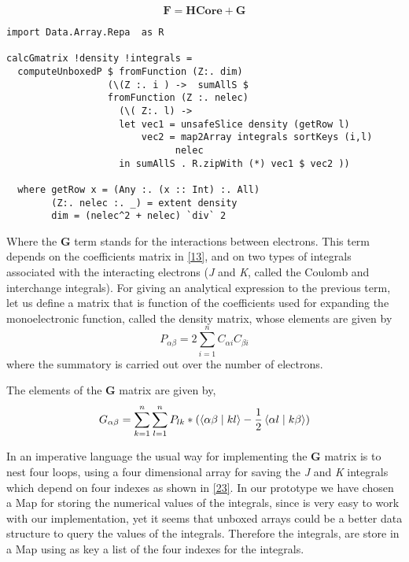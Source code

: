 \documentclass{tmr}
\begin{document}
\begin{equation}\label{22}
 \mathbf{F} = \mathbf{HCore} + \mathbf{G}
\end{equation}

\begin{lstlisting}[float,captionpos=b,belowcaptionskip=4pt, caption= Computation of the  G matrix]
import Data.Array.Repa  as R

calcGmatrix !density !integrals =
  computeUnboxedP $ fromFunction (Z:. dim)
                  (\(Z :. i ) ->  sumAllS $
                  fromFunction (Z :. nelec)
                    (\( Z:. l) ->
                    let vec1 = unsafeSlice density (getRow l)
                        vec2 = map2Array integrals sortKeys (i,l)
                              nelec
                    in sumAllS . R.zipWith (*) vec1 $ vec2 ))

  where getRow x = (Any :. (x :: Int) :. All)
        (Z:. nelec :. _) = extent density
        dim = (nelec^2 + nelec) `div` 2

\end{lstlisting}

Where the \textbf{G} term stands for the interactions between electrons.
This term depends on the coefficients matrix in \eqref{13},
and on two types of integrals associated with the interacting electrons 
(\textit{J} and \textit{K}, called the Coulomb and interchange integrals).
For giving an analytical expression to the previous term, let us define 
a matrix that is function of the coefficients used for expanding the
monoelectronic function, called the density matrix, whose elements
are given by
\begin{equation}\label{23}
 P_{\alpha \beta} = 2\sum^{n}_{i=1} C_{\alpha i} C_{\beta i}
\end{equation}
where the summatory is carried out over the number of electrons.

The elements of the  \textbf{G} matrix are given by,
\begin{equation}\label{24}
 G_{\alpha \beta} = \sum^{n}_{k=1}\sum^{n}_{l=1} P_{lk} * 
(\braket{\alpha\beta \mid kl} - \frac{1}{2} \braket{\alpha l \mid k \beta })
\end{equation}

In an imperative language the usual way for implementing the \textbf{G} matrix
is to nest four loops, using a four dimensional array for saving the \textit{J} and \textit{K}
integrals which depend on four indexes as shown in \eqref{23}.  In our prototype 
we have chosen a Map for storing the numerical values of the integrals, since
is very easy to work with our implementation, yet it seems that unboxed arrays
could be a better data structure to query the values of the integrals. Therefore the integrals,
are store in a Map using as key a list of the four indexes for the integrals.
\end{document}
